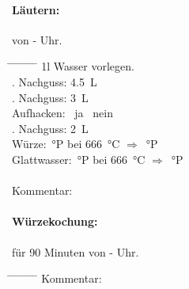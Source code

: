 \documentclass[12pt,oneside,a4paper]{scrartcl}
\begin{document}
\paragraph{Läutern:} von - Uhr.
	\begin{tabbing}
		\hspace{1cm} \= \hspace{1cm} \= \hspace{1cm} \= \hspace{1cm} \= \hspace{1cm} \=\hspace{1cm} \=\hspace{1cm} \=\hspace{1cm} \= \kill
		\> 1l Wasser vorlegen.\\
		\> . Nachguss: \> \> \SI{4,5}{\liter}\\
		\> . Nachguss: \> \> \SI{3}{\liter}\\
		\> \> \> Aufhacken: \> \> \Square \ ja \> \> \Square \ nein\\
		\> . Nachguss: \> \> \SI{2}{\liter}\\
		\> Würze: \> \> \> \,°P\> bei \> \SI{666}{\celsius} \> $\Rightarrow$ \> \,°P\\
		\> Glattwasser: \> \> \> \,°P \> bei \> \SI{666}{\celsius} \> $\Rightarrow$ \> \,°P\\\\
		\> Kommentar: \>\>\>  \\
	\end{tabbing}

\paragraph{Würzekochung:} für 90 Minuten von - Uhr.
	\begin{tabbing}
		\hspace{1cm} \= \hspace{1cm} \= \hspace{1cm} \= \hspace{1cm} \= \hspace{1cm} \= \hspace{1cm} \= \hspace{1cm} \= \hspace{1cm} \= \kill
		\> Kommentar: \> \> \> \\
	\end{tabbing}

\end{document}
